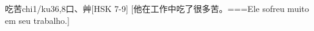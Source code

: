 \begin{EntryWithPhonetic}{吃苦}{chi1/ku3}{6,8}{⼝、⾋}[HSK 7-9]
  [他在工作中吃了很多苦。===Ele sofreu muito em seu trabalho.]
\end{EntryWithPhonetic}
